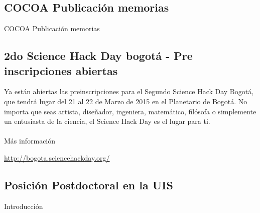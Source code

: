 \documentclass{book}
\begin{document}
\subsection{COCOA Publicación memorias}

COCOA Publicación memorias

\subsection{2do Science Hack Day bogotá - Pre inscripciones abiertas}

Ya están abiertas las preinscripciones para el Segundo Science Hack Day Bogotá, que tendrá lugar del 21 al 22 de Marzo de 2015 en el Planetario de Bogotá. No importa que seas artista, diseñador, ingeniera, matemático, filósofa o simplemente un entusiasta de la ciencia, el Science Hack Day es el lugar para ti.\\
\\
Más información
\begin{center}
\url{http://bogota.sciencehackday.org/}
\end{center}


\subsection{Posición Postdoctoral en la UIS}

\begin{description}
\item[Introducción]
\end{description}
\end{document}
